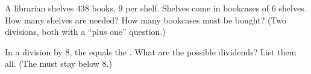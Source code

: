 \begin{exercise}[$\star\star$]\label{exo:g4:division:10}
A librarian shelves $438$ books, $9$ per shelf. Shelves come in
bookcases of $6$ shelves. How many shelves are needed? How many
bookcases must be bought? (Two divisions, both with a
``plus one'' question.)
\end{exercise}

\begin{exercise}[$\star\star$]\label{exo:g4:division:11}
In a division by $8$, the  equals the . What are
the possible dividends? List them all. (The  must stay
below $8$.)
\end{exercise}
